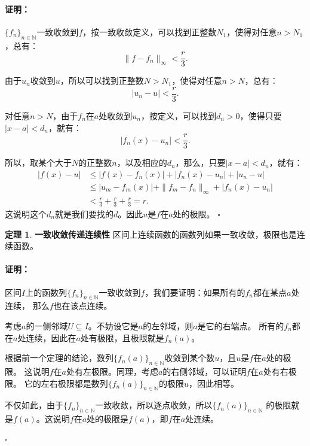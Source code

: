 \documentclass[12pt,UTF8]{ctexbook}
\theoremstyle{definition}
\newtheorem{tm}{定理}[section]
\theoremstyle{plain}
\renewenvironment{proof}{\paragraph{\textbf{证明：}}}{\hfill$\square$}
\begin{document}
\begin{appendix}
\begin{proof}
    $\{f_n\}_{n\in\mathbb{N}}$一致收敛到$f$，按一致收敛定义，可以找到正整数$N_1$，使得对任意$n>N_1$，总有：
    $$ \| f - f_n\|_{\infty} < \frac{r}{3}.$$

    由于$u_n$收敛到$u$，所以可以找到正整数$N>N_1$，使得对任意$n>N$，总有：
    $$ |u_n - u| < \frac{r}{3}.$$
    
    对任意$n>N$，由于$f_n$在$a$处收敛到$u_n$，按定义，可以找到$d_n > 0$，使得只要$|x - a| < d_n$，就有：
    $$ |f_n(x) - u_n| < \frac{r}{3}.$$

    所以，取某个大于$N$的正整数$n$，以及相应的$d_n$，那么，只要$|x - a| < d_n$，就有：
    \begin{align*}
        |f(x) - u| &\leqslant |f(x) - f_n(x)| + |f_n(x) - u_n| + |u_n - u| \\
        &\leqslant |u_m - f_m(x)| + \| f_m - f_n\|_{\infty} + |f_n(x) - u_n| \\
        &< \frac{r}{3} + \frac{r}{3} + \frac{r}{3} = r.
    \end{align*}
    这说明这个$d_n$就是我们要找的$d$。因此$u$是$f$在$a$处的极限。
\end{proof}

\begin{tm}{\textbf{一致收敛传递连续性}}
    区间上连续函数的函数列如果一致收敛，极限也是连续函数。
\end{tm}

\begin{proof}
    区间$I$上的函数列$\{f_n\}_{n\in\mathbb{N}}$一致收敛到$f$，我们要证明：如果所有的$f_n$都在某点$a$处连续，
    那么$f$也在该点连续。

    考虑$a$的一侧邻域$U\subseteq I$。不妨设它是$a$的左邻域，则$a$是它的右端点。
    所有的$f_n$都在$a$处连续，因此在$a$处有极限，且极限就是$f_n(a)$。

    根据前一个定理的结论，数列$\{f_n(a)\}_{n\in\mathbb{N}}$收敛到某个数$u$，且$u$是$f$在$a$处的极限。
    这说明$f$在$a$处有左极限。同理，考虑$a$的右侧邻域，可以证明$f$在$a$处有右极限。
    它的左右极限都是数列$\{f_n(a)\}_{n\in\mathbb{N}}$的极限$u$，因此相等。
    
    不仅如此，由于$\{f_n\}_{n\in\mathbb{N}}$一致收敛，所以逐点收敛，所以$\{f_n(a)\}_{n\in\mathbb{N}}$
    的极限就是$f(a)$。这说明$f$在$a$处的极限是$f(a)$，即$f$在$a$处连续。

\end{proof}


\end{appendix}
\end{document}
